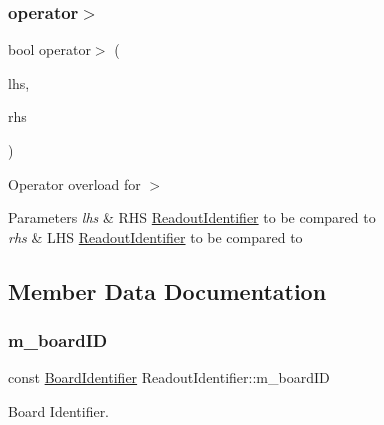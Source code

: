 \subsubsection{\texorpdfstring{operator$>$}{operator>}}
{\footnotesize\ttfamily bool operator$>$ (\begin{DoxyParamCaption}\item[{const \hyperlink{class_readout_identifier}{Readout\+Identifier} \&}]{lhs,  }\item[{const \hyperlink{class_readout_identifier}{Readout\+Identifier} \&}]{rhs }\end{DoxyParamCaption})\hspace{0.3cm}{\ttfamily [friend]}}



Operator overload for $>$ 


\begin{DoxyParams}{Parameters}
{\em lhs} & R\+HS \hyperlink{class_readout_identifier}{Readout\+Identifier} to be compared to \\
\hline
{\em rhs} & L\+HS \hyperlink{class_readout_identifier}{Readout\+Identifier} to be compared to \\
\hline
\end{DoxyParams}


\subsection{Member Data Documentation}
\mbox{\label{class_readout_identifier_ae866229661d1f335f0ef20e382020070}} 
\subsubsection{\texorpdfstring{m\+\_\+board\+ID}{m\_boardID}}
{\footnotesize\ttfamily const \hyperlink{class_board_identifier}{Board\+Identifier} Readout\+Identifier\+::m\+\_\+board\+ID\hspace{0.3cm}{\ttfamily [private]}}



Board Identifier. 

\mbox{\label{class_readout_identifier_a51c3175e53d5178fe8bba193c04052c4}} 
